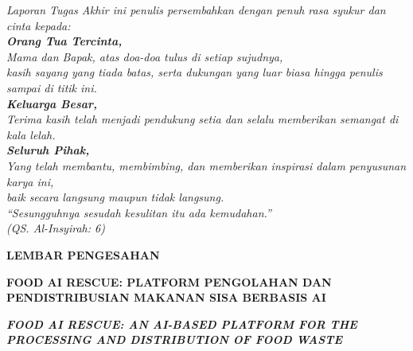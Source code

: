 \begin{center}
    \itshape
    \large
    Laporan Tugas Akhir ini penulis persembahkan dengan penuh rasa syukur dan cinta kepada: \\
    
    \vspace{1cm}
    \textbf{Orang Tua Tercinta,} \\
    Mama dan Bapak, atas doa-doa tulus di setiap sujudnya, \\
    kasih sayang yang tiada batas, serta dukungan yang luar biasa hingga penulis sampai di titik ini. \\
    
    \vspace{1cm}
    \textbf{Keluarga Besar,} \\
    Terima kasih telah menjadi pendukung setia dan selalu memberikan semangat di kala lelah. \\
    
    \vspace{1cm}
    \textbf{Seluruh Pihak,} \\
    Yang telah membantu, membimbing, dan memberikan inspirasi dalam penyusunan karya ini, \\
    baik secara langsung maupun tidak langsung. \\
    
    \vspace{1.5cm}
    \textit{“Sesungguhnya sesudah kesulitan itu ada kemudahan.”} \\
    (QS. Al-Insyirah: 6)
\end{center}

\newpage
{}

\vspace{1.5cm}
\begin{center}
    {\large\bfseries LEMBAR PENGESAHAN \par}
    
    \vspace{2cm}
    
    {\large\bfseries FOOD AI RESCUE: PLATFORM PENGOLAHAN DAN PENDISTRIBUSIAN MAKANAN SISA BERBASIS AI \par}
    \vspace{0.3cm}
    {\large\itshape\bfseries FOOD AI RESCUE: AN AI-BASED PLATFORM FOR THE PROCESSING AND DISTRIBUTION OF FOOD WASTE \par}
\end{center}

